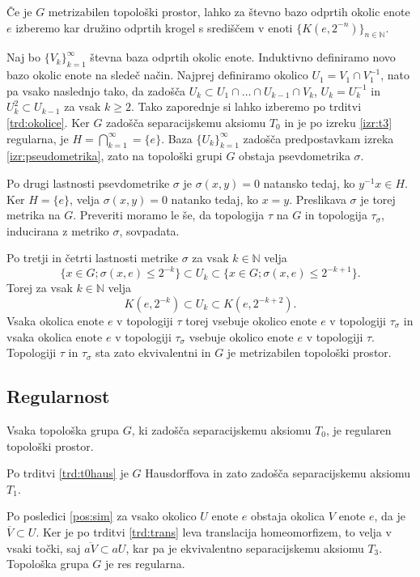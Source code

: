 \documentclass[mat1]{fmfdelo}
\newcommand{\N}{\mathbb N}
\newcommand{\closure}[1]{\overline{#1}}
\begin{document}
\begin{dokaz}
Če je $G$ metrizabilen topološki prostor, lahko za števno bazo odprtih okolic enote $e$ izberemo kar družino odprtih krogel s središčem v enoti $\lbrace K(e, 2^{-n}) \rbrace_{n \in \N}$.

Naj bo $\lbrace V_k \rbrace_{k = 1}^\infty$ števna baza odprtih okolic enote. Induktivno definiramo novo bazo okolic enote na sledeč način. Najprej definiramo okolico $U_1 = V_1 \cap V_1^{-1}$, nato pa vsako naslednjo tako, da zadošča $U_k \subset U_1 \cap \dots \cap U_{k-1}\cap V_k$, $U_k = U_k^{-1}$ in $U_k^2 \subset U_{k-1}$ za vsak $k \geq 2$. Tako zaporednje si lahko izberemo po trditvi \ref{trd:okolice}. Ker $G$ zadošča separacijskemu aksiomu $T_0$ in je po izreku \ref{izr:t3} regularna, je $H = \bigcap_{k=1}^\infty = \lbrace e \rbrace$. Baza $\lbrace U_k \rbrace_{k = 1}^\infty$ zadošča predpostavkam izreka \ref{izr:pseudometrika}, zato na topološki grupi $G$ obstaja psevdometrika $\sigma$.

Po drugi lastnosti psevdometrike $\sigma$ je $\sigma(x, y) = 0$ natansko tedaj, ko $y^{-1}x \in H$. Ker $H = \lbrace e \rbrace$, velja $\sigma(x, y) = 0$ natanko tedaj, ko $x = y$. Preslikava $\sigma$ je torej metrika na $G$. Preveriti moramo le še, da topologija $\tau$ na $G$ in topologija $\tau_\sigma$, inducirana z metriko $\sigma$, sovpadata.

Po tretji in četrti lastnosti metrike $\sigma$ za vsak $k \in \N$ velja
\[ \lbrace x \in G ; \sigma(x, e) \leq 2^{-k} \rbrace \subset U_k \subset \lbrace x \in G ; \sigma(x, e) \leq 2^{-k+1} \rbrace.\]
Torej za vsak $k \in \N$ velja
\[ K(e, 2^{-k}) \subset U_k \subset K(e, 2^{-k+2}). \]
Vsaka okolica enote $e$ v topologiji $\tau$ torej vsebuje okolico enote $e$ v topologiji $\tau_\sigma$ in vsaka okolica enote $e$ v topologiji $\tau_\sigma$ vsebuje okolico enote $e$ v topologiji $\tau$.
Topologiji $\tau$ in $\tau_\sigma$ sta zato ekvivalentni in $G$ je metrizabilen topološki prostor.
\end{dokaz}

\subsection{Regularnost}

\begin{izrek}\label{izr:t3}
	Vsaka topološka grupa $G$, ki zadošča separacijskemu aksiomu $T_0$, je regularen topološki prostor.
\end{izrek}

\begin{dokaz}
	Po trditvi \ref{trd:t0haus} je $G$ Hausdorffova in zato zadošča separacijskemu aksiomu $T_1$.
	
	Po posledici \ref{pos:sim} za vsako okolico $U$ enote $e$ obstaja okolica $V$ enote $e$, da je $\closure{V} \subset U$. Ker je po trditvi \ref{trd:trans} leva translacija homeomorfizem, to velja v vsaki točki, saj $\closure{aV} \subset aU$, kar pa je ekvivalentno separacijskemu aksiomu $T_3$. Topološka grupa $G$ je res regularna.
\end{dokaz}
\end{document}
